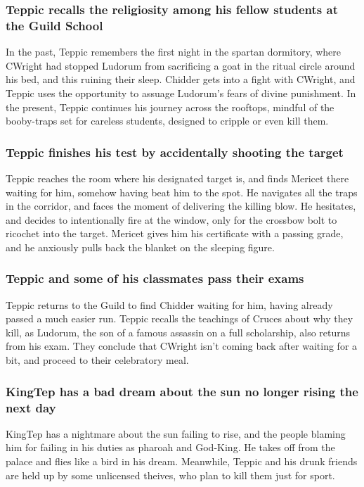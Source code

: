 \subsubsection{\Gls{Teppic} recalls the religiosity among his fellow students at the Guild School}
In the past, \Gls{Teppic} remembers the first night in the spartan dormitory, where \Gls{CWright}
had stopped \Gls{Ludorum} from sacrificing a goat in the ritual circle around his bed, and this
ruining their sleep. \Gls{Chidder} gets into a fight with \Gls{CWright}, and \Gls{Teppic} uses the
opportunity to assuage \Gls{Ludorum}'s fears of divine punishment. In the present, \Gls{Teppic}
continues his journey across the rooftops, mindful of the booby-traps set for careless students,
designed to cripple or even kill them.

\subsubsection{\Gls{Teppic} finishes his test by accidentally shooting the target}
\Gls{Teppic} reaches the room where his designated target is, and finds \Gls{Mericet} there waiting
for him, somehow having beat him to the spot. He navigates all the traps in the corridor, and faces
the moment of delivering the killing blow. He hesitates, and decides to intentionally fire at the
window, only for the crossbow bolt to ricochet into the target. \Gls{Mericet} gives him his
certificate with a passing grade, and he anxiously pulls back the blanket on the sleeping figure.

\subsubsection{\Gls{Teppic} and some of his classmates pass their exams}
\Gls{Teppic} returns to the Guild to find \Gls{Chidder} waiting for him, having already passed
a much easier run. \Gls{Teppic} recalls the teachings of \Gls{Cruces} about why they kill, as
\Gls{Ludorum}, the son of a famous assassin on a full scholarship, also returns from his exam.
They conclude that \Gls{CWright} isn't coming back after waiting for a bit, and proceed to their
celebratory meal.

\subsubsection{\Gls{KingTep} has a bad dream about the sun no longer rising the next day}
\Gls{KingTep} has a nightmare about the sun failing to rise, and the people blaming him for failing
in his duties as pharoah and God-King. He takes off from the palace and flies like a bird in
his dream. Meanwhile, \Gls{Teppic} and his drunk friends are held up by some unlicensed theives, who
plan to kill them just for sport.


